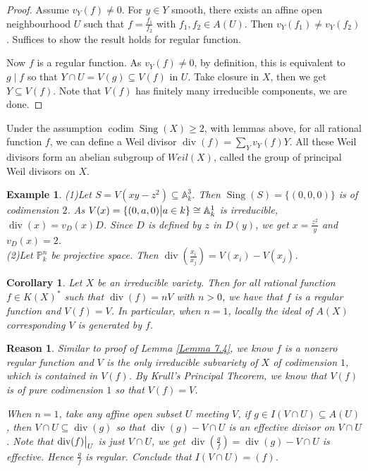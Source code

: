 \documentclass{ctexart}
\newtheorem{reason}{Reason}[section]
\newtheorem{example}{Example}[section]
\newtheorem{corollary}{Corollary}[section]
\newcommand{\codim}{\operatorname{codim}}
\newcommand{\singular}{\operatorname{Sing}}
\newcommand{\divisor}{\operatorname{div}}
\begin{document}
\begin{proof}
    Assume $v_{Y}(f) \neq 0$.
    For $y\in Y$ smooth, there exists an affine open neighbourhood $U$ such that $f = \frac{f_{1}}{f_{2}}$ with $f_{1},f_{2}\in A(U)$.
    Then $v_{Y}(f_{1}) \neq v_{Y}(f_{2})$.
    Suffices to show the result holds for regular function.
    \par
    Now $f$ is a regular function.
    As $v_{Y}(f) \neq 0$, by definition, this is equivalent to $g \mid f$ so that $Y \cap U = V(g) \subseteq V(f)$ in $U$.
    Take closure in $X$, then we get $Y \subseteq V(f)$.
    Note that $V(f)$ has finitely many irreducible components, we are done. 
\end{proof}
Under the assumption $\codim \singular (X) \ge 2$, with lemmas above,
for all rational function $f$, we can define a Weil divisor $\divisor (f) = \sum_{Y} v_{Y}(f)Y$.
All these Weil divisors form an abelian subgroup of $Weil(X)$, called the group of principal Weil divisors on $X$.
\begin{example}
    (1)Let $S = V(xy - z^{2}) \subseteq \mathbb{A}_{k}^{3}$.
    Then $\singular (S) = \{(0, 0, 0)\}$ is of codimension $2$.
    As $V(x) = \{(0, a, 0) \big{|} a\in k\} \cong \mathbb{A}_{k}^{1}$ is irreducible, $\divisor (x) = v_{D}(x)D$.
    Since $D$ is defined by $z$ in $D(y)$, we get $x = \frac{z^{2}}{y}$ and $v_{D}(x) = 2$. \\
    (2)Let $\mathbb{P}_{k}^{n}$ be projective space.
    Then $\divisor (\frac{x_{i}}{x_{j}}) = V(x_{i}) - V(x_{j})$. 
\end{example}
\begin{corollary}
    Let $X$ be an irreducible variety.
    Then for all rational function $f\in K(X)^{\ast}$ such that $\divisor (f) = nV$ with $n > 0$,
    we have that $f$ is a regular function and $V(f) = V$.
    In particular, when $n = 1$, locally the ideal of $A(X)$ corresponding $V$ is generated by $f$.
    \label{Corollary 7.1} 
\end{corollary}
\begin{reason}
    Similar to proof of Lemma \ref{Lemma 7.4}, we know $f$ is a nonzero regular function and $V$ is the only irreducible subvariety of $X$ of codimension $1$, which is contained in $V(f)$.
    By Krull's Principal Theorem, we know that $V(f)$ is of pure codimension $1$ so that $V(f) = V$.
    \par
    When $n = 1$, take any affine open subset $U$ meeting $V$, 
    if $g\in I(V \cap U) \subseteq A(U)$, then $V \cap U \subseteq \divisor (g)$ so that $\divisor (g) - V \cap U$ is an effective divisor on $V \cap U$.
    Note that $\divisor (f)\big{|}_{U}$ is just $V \cap U$, we get $\divisor (\frac{g}{f}) = \divisor (g) - V \cap U$ is effective.
    Hence $\frac{g}{f}$ is regular.
    Conclude that $I(V \cap U) = (f)$.
\end{reason}
\end{document}
